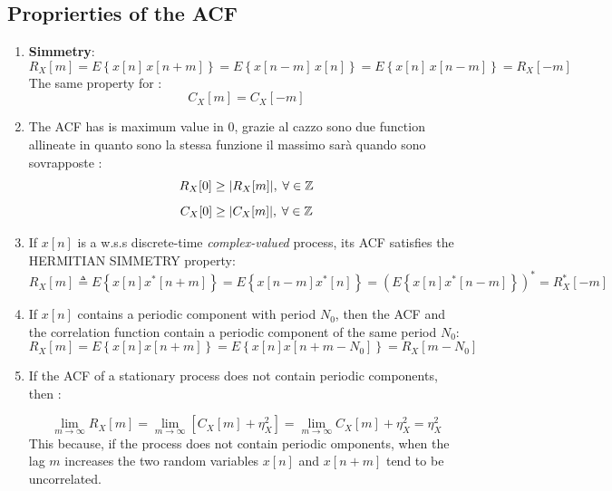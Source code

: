 \subsection{Proprierties of the ACF}
\begin{enumerate}

    \item \textbf{Simmetry}: \[
R_X[m] = E\left\{ x[n]\, x[n + m] \right\}
        = E\left\{ x[n - m]\, x[n] \right\}
        = E\left\{ x[n]\, x[n - m] \right\}
        = R_X[-m]
\]
    The same property for :
    \[
    C_X[m]=C_X[-m]
    \]
    \item  The ACF has is maximum value in 0, grazie al cazzo sono due function allineate in quanto sono la stessa funzione il massimo sarà quando sono sovrapposte :
    \[
    R_X[0]\geq |R_X[m]|,\hspace{0.25em}\forall \in\mathbb{Z}
    \]
  \[
    C_X[0]\geq|C_X[m]|,\hspace{0.25em}\forall \in \mathbb{Z}
    \]
    \item If \(x[n]\) is a w.s.s discrete-time \textit{complex-valued} process, its ACF satisfies the HERMITIAN SIMMETRY property:
    \[
R_X[m] \triangleq E\left\{ x[n] x^*[n + m] \right\}
= E\left\{ x[n - m] x^*[n] \right\}
= \left( E\left\{ x[n] x^*[n - m] \right\} \right)^*
= R_X^*[-m]
\]
    \item If \(x[n]\) contains a periodic component with period \(N_0\), then the ACF and the correlation function contain a periodic component of the same period \(N_0\):
    \[
R_X[m] = E\left\{ x[n] x[n + m] \right\}
= E\left\{ x[n] x[n + m - N_0] \right\}
= R_X[m - N_0]
\]
\item If the ACF of a stationary process does not contain periodic components, then :

\[
\lim_{m \to \infty} R_X[m]
= \lim_{m \to \infty} \left[ C_X[m] + \eta_X^2 \right]
= \lim_{m \to \infty} C_X[m] + \eta_X^2
= \eta_X^2
\]
This because, if the process does not contain periodic omponents, when the lag \(m\) increases the two random variables \(x[n]\) and \(x[n+m]\) tend to be uncorrelated.
\end{enumerate}
